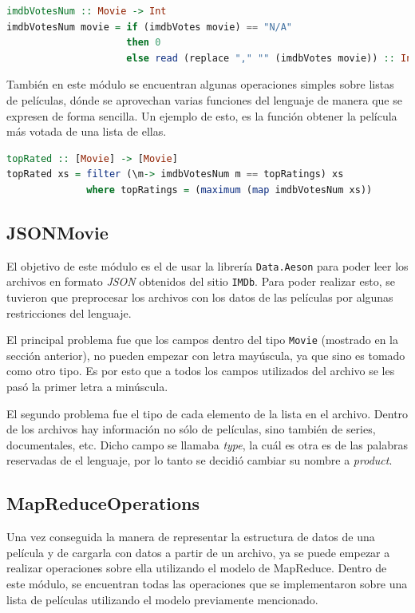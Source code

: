 \documentclass[a4paper,11pt]{article}
\begin{document}
\begin{lstlisting}[language=Haskell, frame=single]
imdbVotesNum :: Movie -> Int
imdbVotesNum movie = if (imdbVotes movie) == "N/A" 
                     then 0 
                     else read (replace "," "" (imdbVotes movie)) :: Int
\end{lstlisting}

También en este módulo se encuentran algunas operaciones simples sobre listas de películas, dónde se aprovechan varias funciones del lenguaje de manera que se expresen de forma sencilla. Un ejemplo de esto, es la función obtener la película más votada de una lista de ellas.

\begin{lstlisting}[language=Haskell, frame=single]
topRated :: [Movie] -> [Movie]
topRated xs = filter (\m-> imdbVotesNum m == topRatings) xs 
              where topRatings = (maximum (map imdbVotesNum xs))
\end{lstlisting}

\subsection{JSONMovie}

El objetivo de este módulo es el de usar la librería \texttt{Data.Aeson} para poder leer los archivos en formato \textit{JSON} obtenidos del sitio \texttt{IMDb}.
Para poder realizar esto, se tuvieron que preprocesar los archivos con los datos de las películas por algunas restricciones del lenguaje. 

El principal problema fue que los campos dentro del tipo \texttt{Movie} (mostrado en la sección anterior), no pueden empezar con letra mayúscula, ya que sino es tomado como otro tipo. Es por esto que a todos los campos utilizados del archivo se les pasó la primer letra a minúscula. 

El segundo problema fue el tipo de cada elemento de la lista en el archivo. Dentro de los archivos hay información no sólo de películas, sino también de series, documentales, etc. Dicho campo se llamaba \textit{type}, la cuál es otra es de las palabras reservadas de el lenguaje, por lo tanto se decidió cambiar su nombre a \textit{product}.

\subsection{MapReduceOperations}

Una vez conseguida la manera de representar la estructura de datos de una película y de cargarla con datos a partir de un archivo, ya se puede empezar a realizar operaciones sobre ella utilizando el modelo de MapReduce.
Dentro de este módulo, se encuentran todas las operaciones que se implementaron sobre una lista de películas utilizando el modelo previamente mencionado.
\end{document}
